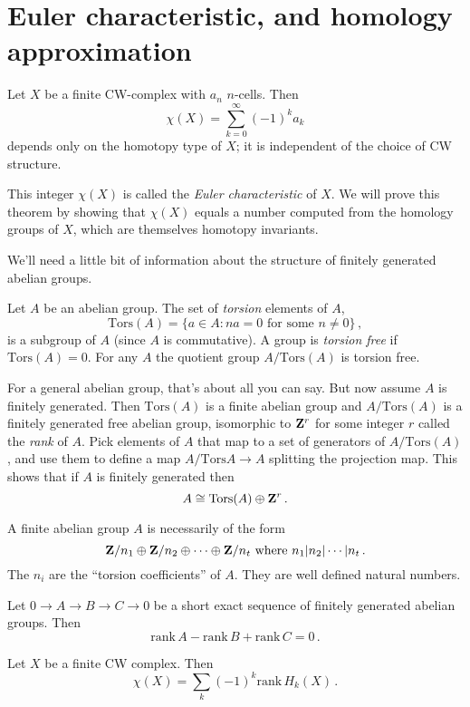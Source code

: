 \section{Euler characteristic, and homology approximation}


\begin{theorem} Let $X$ be a finite CW-complex with $a_n$ $n$-cells. Then 
\[
\chi(X)=\sum^\infty_{k=0}(-1)^k a_k
\]
depends only on the homotopy type of $X$; it is independent of the choice of
CW structure. 
\end{theorem}
This integer $\chi(X)$ is called the {\em Euler characteristic} of $X$. We will prove this theorem by showing that $\chi(X)$ equals a number computed from the homology groups of $X$, which are themselves homotopy invariants. 

We'll need a little bit of information about the structure of finitely generated abelian groups.

Let $A$ be an abelian group. The set of {\em torsion} elements of $A$,
\[
\mathrm{Tors}(A)=\{a\in A:na=0\,\,\text{for some}\,\,n\neq0\}\,,
\]
is a subgroup of $A$ (since $A$ is commutative). A group is \emph{torsion free}
if $\mathrm{Tors}(A)=0$. For any $A$ the quotient group 
$A/\mathrm{Tors}(A)$ is torsion free. 

For a general abelian group, that's about all you can say. But now assume $A$ is finitely generated. Then $\mathrm{Tors}(A)$ is a finite abelian group and
$A/\mathrm{Tors}(A)$ is a finitely generated free abelian group, isomorphic to $\mathbf Z^r$ for some integer $r$ called the \emph{rank} of $A$. Pick elements of
$A$ that map to a set of generators of $A/\mathrm{Tors}(A)$, and use them
to define a map $A/\mathrm{Tors}A\to A$ splitting the projection map. This shows that if $A$ is finitely generated then
\[
A\cong\mathrm{Tors}(A)\oplus\mathbf Z^r\,.
\]

A finite abelian group $A$ is necessarily of the form 
\[
\mathbf Z/n_1\oplus\mathbf Z/n_2\oplus\cdots\oplus\mathbf Z/n_t\,\,\hbox{where}\,\,
n_1|n_2|\cdots|n_t\,.
\]
The $n_i$ are the ``torsion coefficients'' of $A$. 
They are well defined natural numbers.

\begin{lemma} Let $0\to A\to B\to C\to 0$ be a short exact sequence of finitely
generated abelian groups. Then
\[
\mathrm{rank}\,A-\mathrm{rank}\,B+\mathrm{rank}\,C=0\,.
\]
\end{lemma}

\begin{theorem} Let $X$ be a finite CW complex. Then
\[
\chi(X)=\sum_k(-1)^k\mathrm{rank}\,H_k(X)\,.
\]
\end{theorem}

